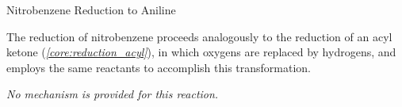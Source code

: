       \begin{core}[label=core:red_nitrobenzene]{Nitrobenzene Reduction to Aniline}

        The reduction of nitrobenzene proceeds analogously to the reduction of an acyl ketone (\textit{\autoref{core:reduction_acyl}}), in which oxygens are replaced by hydrogens, and employs the same reactants to accomplish this transformation.


        \textit{No mechanism is provided for this reaction.}

      \end{core}

